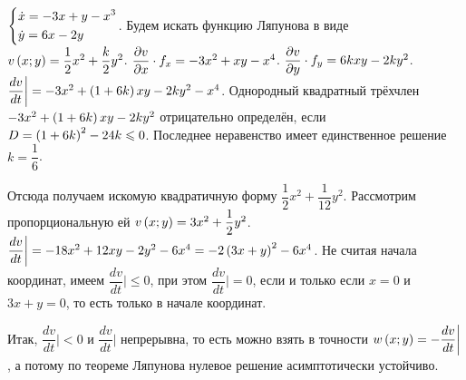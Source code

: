 \documentclass[a5paper,10pt]{article}
\begin{document}
$\left\{ \begin{aligned}& \dot{x} = -3x + y - x^3 \\& \dot{y} = 6x - 2y\end{aligned} \right.$. Будем искать функцию Ляпунова в виде $v\left(x; y\right) = \dfrac {1} {2} x^2 + \dfrac {k} {2} y^2 $. 
$\dfrac{\partial v}{\partial x} \cdot f_{x} = -3x^{2} + xy - x^{4}$.
$\dfrac{\partial v}{\partial y} \cdot f_{y} = 6kxy - 2ky^2$.
$\dfrac{dv}{dt}\bigg| = -3x^2 + \left(1 + 6k\right) xy - 2ky^2 - x^4$.
Однородный квадратный трёхчлен $-3x^2 + \left(1 + 6k\right) xy - 2ky^2$ отрицательно определён, если $D = \left(1 + 6k\right)^2 - 24k \leqslant 0$. Последнее неравенство имеет единственное решение $k = \dfrac {1} {6}$.

Отсюда получаем искомую квадратичную форму $\dfrac {1} {2} x^2 + \dfrac {1} {12} y^2 $. Рассмотрим пропорциональную ей $v\left(x; y\right) = 3x^2 + \dfrac {1} {2}y^2$. $\dfrac{dv}{dt}\bigg| = -18 x^2 + 12 xy - 2y^2 - 6x^4 = -2 \left(3x + y\right)^2 - 6x^4$. Не считая начала координат, имеем $\dfrac{dv}{dt}\bigg| \le 0$, при этом $\dfrac{dv}{dt}\bigg| = 0$, если и только если $x = 0$ и $3x + y = 0$, то есть только в начале координат.

Итак, $\dfrac{dv}{dt}\bigg| < 0$ и $\dfrac{dv}{dt}\bigg|$ непрерывна, то есть можно взять в точности $w\left(x; y\right) = -\dfrac{dv}{dt}\bigg|$, а потому по теореме Ляпунова нулевое решение асимптотически устойчиво.
\end{document}
